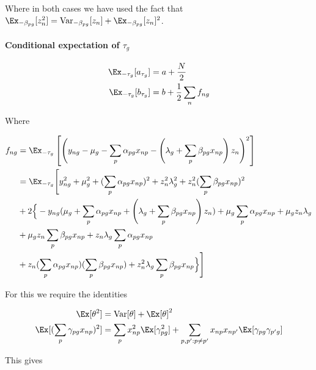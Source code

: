 Where in both cases we have used the fact that $\Ex_{-\beta_{pg}} [z_n^2] = \text{Var}_{-\beta_{pg}}[z_n] + \Ex_{-\beta_{pg}}[z_n]^2$.

\paragraph{Conditional expectation of $\tau_g$}

\begin{equation}
\begin{aligned}
\Ex_{-\tau_g}[a_{\tau_g}] & = a + \frac{N}{2} \\
\Ex_{-\tau_g}[b_{\tau_g}] & = b + \frac{1}{2} \sum_n f_{ng}
\end{aligned}
\end{equation}

Where

\begin{equation}
\begin{aligned}
f_{ng}  & =  \Ex_{-\tau_g} \left[ \left(y_{ng} - \mu_g - \sum_p \alpha_{pg} x_{np} - \left( \lambda_g + \sum_p \beta_{pg} x_{np} \right) z_n
\right)^2 \right] \\
 & =   \Ex_{-\tau_g} \Bigg[ y_{ng}^2 + \mu_g^2 + (\sum_p \alpha_{pg} x_{np})^2 + z_n^2 \lambda_g^2 + z_n^2 (\sum_p \beta_{pg}x_{np})^2  \\
& + 2 \Big\{
-y_{ng} (\mu_g + \sum_p \alpha_{pg} x_{np} + \left( \lambda_g + \sum_p \beta_{pg} x_{np} \right) z_n )
 + \mu_g \sum_p \alpha_{pg} x_{np} + \mu_g z_n \lambda_g  \\
 & + \mu_g z_n \sum_p \beta_{pg} x_{np}
+ z_n \lambda_g \sum_p \alpha_{pg} x_{np} \\
& + z_n (\sum_p \alpha_{pg} x_{np})(\sum_p\beta_{pg} x_{np})
+ z_n^2 \lambda_g \sum_p \beta_{pg} x_{np}
\Big\}
\Bigg]
\end{aligned}
\end{equation}

For this we require the identities

\begin{equation}
\begin{aligned}
\Ex[\theta^2] & = \text{Var}[\theta] + \Ex[\theta]^2 \\
\Ex[(\sum_p \gamma_{pg} x_{np})^2] & = \sum_p x_{np}^2 \Ex[\gamma_{pg}^2] +
\sum_{p,p': p \neq p'} x_{np} x_{np'} \Ex[\gamma_{pg} \gamma_{p'g}]
\end{aligned}
\end{equation}

This gives

